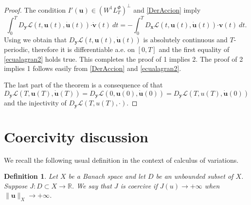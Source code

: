 \documentclass[twoside]{article}
\newtheorem{defi}[thm]{Definition}
\theoremstyle{remark}
\newcommand{\lphi}{L^{\Phi}}
\newcommand{\wphi}{W^{1}\lphi}
\renewcommand{\b}[1]{\boldsymbol{#1}}
\newcommand{\rr}{\mathbb{R}}
\newcommand{\ccdot}{\b{\cdot}}
\begin{document}
\begin{proof} The condition  $I'(\b{u})\in\left( \wphi_T\right)^{\perp}$ and \eqref{DerAccion} imply 
\[\int_0^T  D_{\b{y}} \mathcal{L}(t,\b{u}(t),\b{\dot{u}}(t))\ccdot \b{\dot{v}}(t)\ dt
=-\int_0^T  D_{\b{x}}\mathcal{L}(t,\b{u}(t),\b{\dot{u}}(t)) \ccdot\b{ v}(t)\ dt. \]
Using \cite[pp. 6-7]{mawhin2010critical} we obtain that  $D_{\b{y}}\mathcal{L}(t,\b{u}(t),\b{\dot{u}}(t))$ is absolutely continuous and 
\linebreak
$T$-periodic, therefore it is differentiable a.e. on $[0,T]$ and the first equality of \eqref{ecualagran2} holds true.
This completes the proof of  1 implies 2. The proof of 2 implies  1  follows easily 
from \eqref{DerAccion}  and \eqref{ecualagran2}.

The last part of the theorem is a consequence of that \linebreak
$D_{\b{y}}\mathcal{L}(T,\b{u}(T),\b{\dot{u}}(T))=D_{\b{y}}\mathcal{L}(0,\b{u}(0),\b{\dot{u}}(0))=D_{\b{y}}\mathcal{L}(T,u(T),\b{\dot{u}}(0))$ and the injectivity of $D_{\b{y}}\mathcal{L}(T,u(T),\cdot)$.
\end{proof}


\section{Coercivity discussion}

We recall the following usual definition in the context  of calculus of variations. 

\begin{defi} Let $X$ be a Banach space and let $D$ be an unbounded subset of $X$. Suppose $J:D\subset X\to\rr$. We say that $J$ is \emph{coercive} if $J(u)\to +\infty$ when \linebreak $\|\b{u}\|_X\to +\infty$. 
\end{defi}
\end{document}
